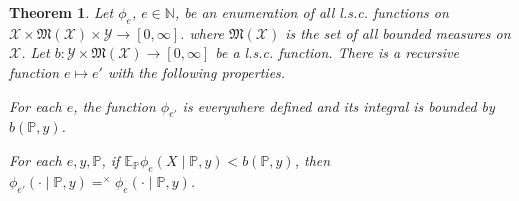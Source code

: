 \documentclass{article}
\newtheorem{theorem}{Theorem}
\theoremstyle{definition}
\theoremstyle{definition}
\newcommand{\natnums}{\mathbb{N}}
\newcommand{\probP}{\mathbb{P}}
\newcommand{\expectE}{\mathbb{E}}
\begin{document}
\begin{theorem}
	Let $\phi_e$, $e\in\natnums$, be an enumeration of all l.s.c. functions on $\mathcal{X}\times\mathfrak{M}(\mathcal{X})\times\mathcal{Y} \to [0,\infty]$. where $\mathfrak{M}(\mathcal{X})$ is the set of all bounded measures on $\mathcal{X}$. Let $b: \mathcal{Y}\times\mathfrak{M}(\mathcal{X})\to [0,\infty]$ be a l.s.c. function. There is a recursive function $e \mapsto e'$ with the following properties.
	
	For each $e$, the function $\phi_{e'}$ is everywhere defined and its integral is bounded by $b(\probP, y)$.
	
	For each $e, y, \probP$, if  $\expectE_\probP \phi_e(X\mid \probP, y) < b(\probP, y)$, then $\phi_{e'}(\cdot \mid \probP, y) =^\times \phi_e(\cdot \mid \probP, y)$.
\end{theorem}
\end{document}
